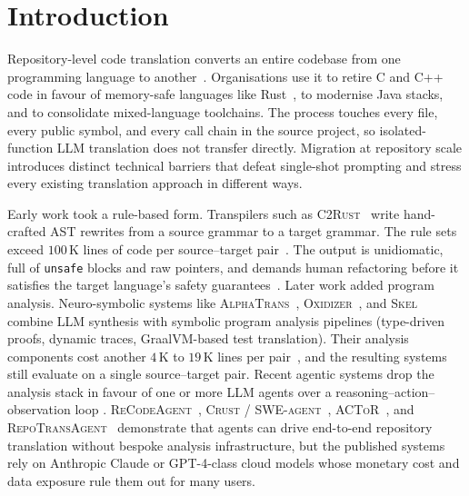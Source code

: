 \section{Introduction}
\label{sec:intro}

Repository-level code translation converts an entire codebase from one
programming language to another~\cite{ibrahimzada2026recodeagent}.
Organisations use it to retire C and C++ code in favour of memory-safe
languages like Rust~\cite{szekeres2013sok,p58_syzygy,p56_rust_ffi_verification},
to modernise Java stacks, and to consolidate mixed-language toolchains.
The process touches every file, every public symbol, and every call chain
in the source project, so isolated-function LLM translation does not
transfer directly. Migration at repository scale introduces distinct
technical barriers that defeat single-shot prompting and stress every
existing translation approach in different ways.

Early work took a rule-based form. Transpilers such as
\textsc{C2Rust}~\cite{c2rust,p38_c2rust} write hand-crafted AST rewrites
from a source grammar to a target grammar. The rule sets exceed
$100\,\text{K}$ lines of code per source--target pair~\cite{p01_recodeagent}.
The output is unidiomatic, full of \texttt{unsafe} blocks and raw
pointers, and demands human refactoring before it satisfies the target
language's safety guarantees~\cite{p50_rav1d_c2rust_case,p51_libexpat_c2rust_case}.
Later work added program analysis. Neuro-symbolic systems like
\textsc{AlphaTrans}~\cite{yang2024alphatrans,p02_alphatrans},
\textsc{Oxidizer}~\cite{siddiq2024oxidizer,p05_oxidizer}, and
\textsc{Skel}~\cite{p64_skel,p65_skel_pldi} combine LLM synthesis with
symbolic program analysis pipelines (type-driven proofs, dynamic traces,
GraalVM-based test translation). Their analysis components cost another
$4\,\text{K}$ to $19\,\text{K}$ lines per pair~\cite{p01_recodeagent},
and the resulting systems still evaluate on a single source--target
pair. Recent agentic systems drop the analysis stack in favour of one or
more LLM agents over a reasoning--action--observation loop
\cite{yao2023react}. \textsc{ReCodeAgent}~\cite{ibrahimzada2026recodeagent},
\textsc{Crust} / \textsc{SWE-agent}~\cite{p30_crust_bench,yang2024sweagent},
\textsc{ACToR}~\cite{p31_actor}, and
\textsc{RepoTransAgent}~\cite{p62_repograph,p52_repotransagent}
demonstrate that agents can drive end-to-end repository translation
without bespoke analysis infrastructure, but the published systems rely
on Anthropic Claude or GPT-4-class cloud models whose monetary cost and
data exposure rule them out for many users.

